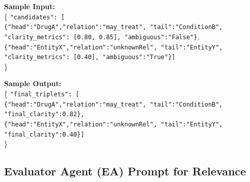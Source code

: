 \documentclass{article}
\begin{document}
\begin{tcolorbox}[colframe=black!25, colback=black!5, boxrule=0.5pt, arc=2pt]
\vspace{1mm}
\noindent
\textbf{Sample Input:}\\
\{
  \texttt{"candidates": [}\\
  \quad \texttt{\{"head":"DrugA","relation":"may\_treat",
  "tail":"ConditionB",}\\
  \quad \quad \texttt{"clarity\_metrics": [0.80, 0.85], "ambiguous":"False"\}},\\
  \quad \texttt{\{"head":"EntityX","relation":"unknownRel",
  "tail":"EntityY",}\\
  \quad \quad \texttt{"clarity\_metrics": [0.40], "ambiguous":"True"\}]}\\
\}

\vspace{1mm}
\noindent
\textbf{Sample Output:}\\
\{
  \texttt{"final\_triplets": [}\\
  \quad \texttt{\{"head":"DrugA","relation":"may\_treat",
  "tail":"ConditionB",}\\
  \quad \quad \texttt{"final\_clarity":0.82\},}\\
  \quad \texttt{\{"head":"EntityX","relation":"unknownRel",
  "tail":"EntityY",}\\
  \quad \quad \texttt{"final\_clarity":0.40\}]}\\
\}
\end{tcolorbox}
\newpage

\subsection{Evaluator Agent (EA) Prompt for Relevance}
\label{appendix:ea_prompt_relevance}
\end{document}
